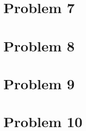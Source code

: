 \documentclass[journal]{IEEEtran}
\begin{document}
\section{Problem 7}

\medskip

\section{Problem 8}
\medskip

\section{Problem 9}
\medskip

\section{Problem 10}
\medskip

 
\end{document}
